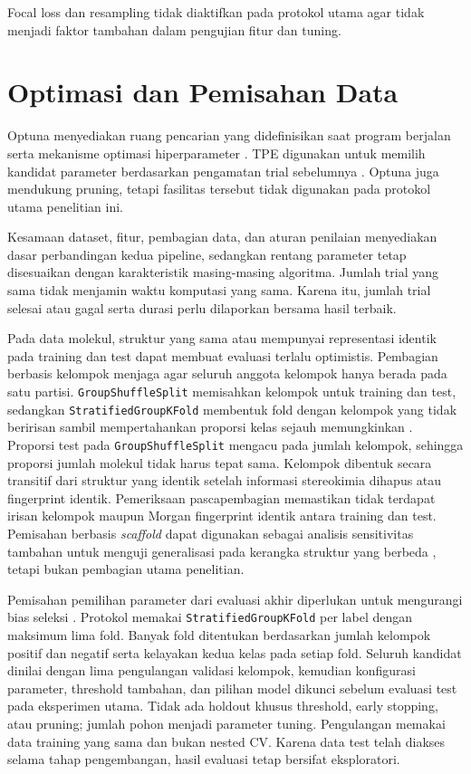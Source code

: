 Focal loss dan resampling tidak diaktifkan pada protokol utama agar tidak menjadi faktor tambahan dalam pengujian fitur dan tuning.

\section{Optimasi dan Pemisahan Data}

Optuna menyediakan ruang pencarian yang didefinisikan saat program berjalan serta mekanisme optimasi hiperparameter \cite{akiba2019}. TPE digunakan untuk memilih kandidat parameter berdasarkan pengamatan trial sebelumnya \cite{bergstra2011}. Optuna juga mendukung pruning, tetapi fasilitas tersebut tidak digunakan pada protokol utama penelitian ini.

Kesamaan dataset, fitur, pembagian data, dan aturan penilaian menyediakan dasar perbandingan kedua pipeline, sedangkan rentang parameter tetap disesuaikan dengan karakteristik masing-masing algoritma. Jumlah trial yang sama tidak menjamin waktu komputasi yang sama. Karena itu, jumlah trial selesai atau gagal serta durasi perlu dilaporkan bersama hasil terbaik.

Pada data molekul, struktur yang sama atau mempunyai representasi identik pada training dan test dapat membuat evaluasi terlalu optimistis. Pembagian berbasis kelompok menjaga agar seluruh anggota kelompok hanya berada pada satu partisi. \texttt{GroupShuffleSplit} memisahkan kelompok untuk training dan test, sedangkan \texttt{StratifiedGroupKFold} membentuk fold dengan kelompok yang tidak beririsan sambil mempertahankan proporsi kelas sejauh memungkinkan \cite{sklearngroupshuffle2026,sklearnstratifiedgroup2026}. Proporsi test pada \texttt{GroupShuffleSplit} mengacu pada jumlah kelompok, sehingga proporsi jumlah molekul tidak harus tepat sama. Kelompok dibentuk secara transitif dari struktur yang identik setelah informasi stereokimia dihapus atau fingerprint identik. Pemeriksaan pascapembagian memastikan tidak terdapat irisan kelompok maupun Morgan fingerprint identik antara training dan test. Pemisahan berbasis \textit{scaffold} dapat digunakan sebagai analisis sensitivitas tambahan untuk menguji generalisasi pada kerangka struktur yang berbeda \cite{wu2018}, tetapi bukan pembagian utama penelitian.

Pemisahan pemilihan parameter dari evaluasi akhir diperlukan untuk mengurangi bias seleksi \cite{cawley2010}. Protokol memakai \texttt{StratifiedGroupKFold} per label dengan maksimum lima fold. Banyak fold ditentukan berdasarkan jumlah kelompok positif dan negatif serta kelayakan kedua kelas pada setiap fold. Seluruh kandidat dinilai dengan lima pengulangan validasi kelompok, kemudian konfigurasi parameter, threshold tambahan, dan pilihan model dikunci sebelum evaluasi test pada eksperimen utama. Tidak ada holdout khusus threshold, early stopping, atau pruning; jumlah pohon menjadi parameter tuning. Pengulangan memakai data training yang sama dan bukan nested CV. Karena data test telah diakses selama tahap pengembangan, hasil evaluasi tetap bersifat eksploratori.

